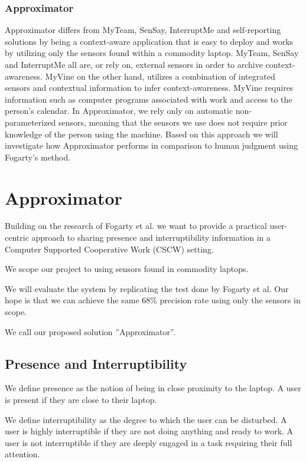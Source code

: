 \documentclass{sigchi}
\begin{document}
\subsubsection{Approximator}
Approximator differs from MyTeam, SenSay, InterruptMe and self-reporting solutions by being a context-aware application that is easy to deploy and works by utilizing only the sensors found within a commodity laptop.
MyTeam, SenSay and InterruptMe all are, or rely on, external sensors in order to archive context-awareness.
MyVine on the other hand, utilizes a combination of integrated sensors and contextual information to infer context-awareness.
MyVine requires information such as computer programs associated with work and access to the person's calendar.
In Approximator, we rely only on automatic non-parameterized sensors, meaning that the sensors we use does not require prior knowledge of the person using the machine.
Based on this approach we will investigate how Approximator performs in comparison to human judgment using Fogarty's method.

\section{Approximator}
Building on the research of Fogarty et al.\cite{fogarty2005predicting} we want to provide a practical user-centric approach to sharing presence and interruptibility information in a Computer Supported Cooperative Work (CSCW) setting.

We scope our project to using sensors found in commodity laptops.

We will evaluate the system by replicating the test done by Fogarty et al.
Our hope is that we can achieve the same 68\% precision rate using only the sensors in scope.

We call our proposed solution ''Approximator''.

\subsection{Presence and Interruptibility}
We define presence as the notion of being in close proximity to the laptop. A user is present if they are close to their laptop.

We define interruptibility as the degree to which the user can be disturbed. A user is highly interruptible if they are not doing anything and ready to work. A user is not interruptible if they are deeply engaged in a task requiring their full attention.
\end{document}
